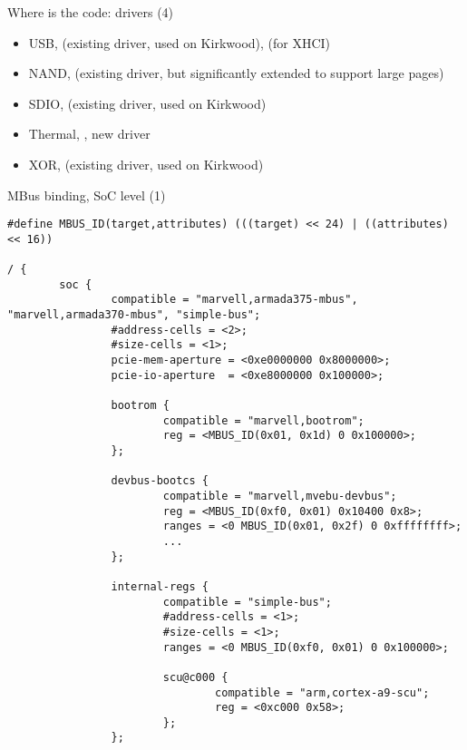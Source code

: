 \begin{frame}{Where is the code: drivers (4)}

\begin{itemize}
\item USB,  (existing driver, used
  on Kirkwood),  (for XHCI)
\item NAND,  (existing driver,
  but significantly extended to support large pages)
\item SDIO,  (existing driver, used on
  Kirkwood)
\item Thermal, , new driver
\item XOR,  (existing driver, used on
  Kirkwood)
\end{itemize}

\end{frame}

\begin{frame}[fragile]{MBus binding, SoC level (1)}

\tiny
\begin{verbatim}
#define MBUS_ID(target,attributes) (((target) << 24) | ((attributes) << 16))

/ {
        soc {
                compatible = "marvell,armada375-mbus", "marvell,armada370-mbus", "simple-bus";
                #address-cells = <2>;
                #size-cells = <1>;
                pcie-mem-aperture = <0xe0000000 0x8000000>;
                pcie-io-aperture  = <0xe8000000 0x100000>;

                bootrom {
                        compatible = "marvell,bootrom";
                        reg = <MBUS_ID(0x01, 0x1d) 0 0x100000>;
                };

                devbus-bootcs {
                        compatible = "marvell,mvebu-devbus";
                        reg = <MBUS_ID(0xf0, 0x01) 0x10400 0x8>;
                        ranges = <0 MBUS_ID(0x01, 0x2f) 0 0xffffffff>;
                        ...
                };

                internal-regs {
                        compatible = "simple-bus";
                        #address-cells = <1>;
                        #size-cells = <1>;
                        ranges = <0 MBUS_ID(0xf0, 0x01) 0 0x100000>;

                        scu@c000 {
                                compatible = "arm,cortex-a9-scu";
                                reg = <0xc000 0x58>;
                        };
                };
\end{verbatim}

\end{frame}

